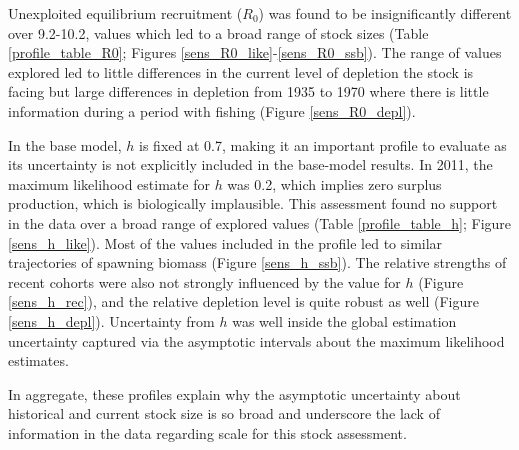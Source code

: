 \documentclass[11pt,
  english,
  a4paper,
]{article}
\begin{document}
\leavevmode\tagmcend\tagstructend\par


Unexploited equilibrium recruitment ({\(R_0\)\leavevmode\tagmcend\tagstructend}) was found to be insignificantly different over 9.2-10.2, values which led to a broad range of stock sizes (Table \ref{profile_table_R0}; Figures \ref{sens_R0_like}-\ref{sens_R0_ssb}). The range of values explored led to little differences in the current level of depletion the stock is facing but large differences in depletion from 1935 to 1970 where there is little information during a period with fishing (Figure \ref{sens_R0_depl}).

\leavevmode\tagmcend\tagstructend\par


In the base model, {\(h\)\leavevmode\tagmcend\tagstructend} is fixed at 0.7, making it an important profile to evaluate as its uncertainty is not explicitly included in the base-model results. In 2011, the maximum likelihood estimate for {\(h\)\leavevmode\tagmcend\tagstructend} was 0.2, which implies zero surplus production, which is biologically implausible. This assessment found no support in the data over a broad range of explored values (Table \ref{profile_table_h}; Figure \ref{sens_h_like}). Most of the values included in the profile led to similar trajectories of spawning biomass (Figure \ref{sens_h_ssb}). The relative strengths of recent cohorts were also not strongly influenced by the value for {\(h\)\leavevmode\tagmcend\tagstructend} (Figure \ref{sens_h_rec}), and the relative depletion level is quite robust as well (Figure \ref{sens_h_depl}). Uncertainty from {\(h\)\leavevmode\tagmcend\tagstructend} was well inside the global estimation uncertainty captured via the asymptotic intervals about the maximum likelihood estimates.

\leavevmode\tagmcend\tagstructend\par


In aggregate, these profiles explain why the asymptotic uncertainty about historical and current stock size is so broad and underscore the lack of information in the data regarding scale for this stock assessment.
\end{document}
